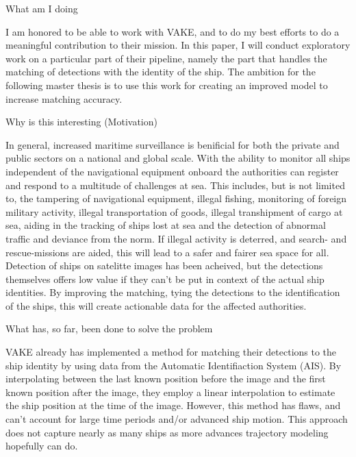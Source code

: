 \begin{info}
	What am I doing
\end{info}

I am honored to be able to work with VAKE, and to do my best efforts to do a meaningful contribution to their mission. In this paper, I will conduct exploratory work on a particular part of their pipeline, namely the part that handles the matching of detections with the identity of the ship. The ambition for the following master thesis is to use this work for creating an improved model to increase matching accuracy. 

\begin{info}
	Why is this interesting (Motivation)
\end{info}
In general, increased maritime surveillance is benificial for both the private and public sectors on a national and global scale. With the ability to monitor all ships independent of the navigational equipment onboard the authorities can register and respond to a multitude of challenges at sea. This includes, but is not limited to, the tampering of navigational equipment, illegal fishing, monitoring of foreign military activity, illegal transportation of goods, illegal transhipment of cargo at sea, aiding in the tracking of ships lost at sea and the detection of abnormal traffic and deviance from the norm. If illegal activity is deterred, and search- and rescue-missions are aided, this will lead to a safer and fairer sea space for all. Detection of ships on satelitte images has been acheived, but the detections themselves offers low value if they can't be put in context of the actual ship identities. By improving the matching, tying the detections to the identification of the ships, this will create actionable data for the affected authorities.     

\begin{info}
	What has, so far, been done to solve the problem
\end{info}
VAKE already has implemented a method for matching their detections to the ship identity by using data from the Automatic Identifiaction System (AIS). By interpolating between the last known position before the image and the first known position after the image, they employ a linear interpolation to estimate the ship position at the time of the image. However, this method has flaws, and can't account for large time periods and/or advanced ship motion. This approach does not capture nearly as many ships as more advances trajectory modeling hopefully can do.

